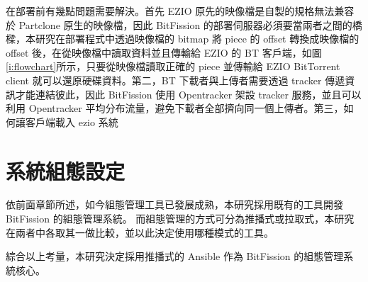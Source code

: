 在部署前有幾點問題需要解決。首先 EZIO 原先的映像檔是自製的規格無法兼容於 Partclone 原生的映像檔，因此 BitFission 的部署伺服器必須要當兩者之間的橋樑，本研究在部署程式中透過映像檔的 bitmap 將 piece 的 offset 轉換成映像檔的 offset 後，在從映像檔中讀取資料並且傳輸給 EZIO 的 BT 客戶端，如圖\ref{i:flowchart}所示，只要從映像檔讀取正確的 piece 並傳輸給 EZIO BitTorrent client 就可以還原硬碟資料。第二，BT 下載者與上傳者需要透過 tracker 傳遞資訊才能連結彼此，因此 BitFission 使用 Opentracker 架設 tracker 服務，並且可以利用 Opentracker 平均分布流量，避免下載者全部擠向同一個上傳者。第三，如何讓客戶端載入 ezio 系統





\section{系統組態設定}
依前面章節所述，如今組態管理工具已發展成熟，本研究採用既有的工具開發 BitFission 的組態管理系統。
而組態管理的方式可分為推播式或拉取式，本研究在兩者中各取其一做比較，並以此決定使用哪種模式的工具。


綜合以上考量，本研究決定採用推播式的 Ansible 作為 BitFission 的組態管理系統核心。

